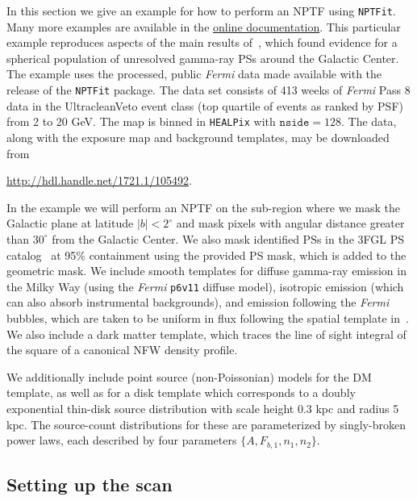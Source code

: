 In this section we give an example for how to perform an NPTF using \texttt{NPTFit}.  Many more examples are available in the \href{http://nptfit.readthedocs.io}{online documentation}.  This particular example reproduces aspects of the main results of~\cite{Lee:2015fea}, which found evidence for a spherical population of unresolved gamma-ray PSs around the Galactic Center.  The example uses the processed, public {\it Fermi} data made available with the release of the \texttt{NPTFit} package.  The data set consists of 413 weeks of \emph{Fermi} Pass 8 data in the UltracleanVeto event class (top quartile of events as ranked by PSF) from 2 to 20 GeV.  The map is binned in \texttt{HEALPix} with $\mathtt{nside} = 128$.  The data, along with the exposure map and background templates, may be downloaded from 
\begin{center}
\url{http://hdl.handle.net/1721.1/105492}.
\end{center}

In the example we will perform an NPTF on the sub-region where we mask the Galactic plane at latitude $|b| < 2^\circ$ and mask pixels with angular distance greater than $30^\circ$ from the Galactic Center.  We also mask identified PSs in the 3FGL PS catalog~\cite{Acero:2015hja} at 95\% containment using the provided PS mask, which is added to the geometric mask.  We include smooth templates for diffuse gamma-ray emission in the Milky Way (using the {\it Fermi} \texttt{p6v11} diffuse model), isotropic emission (which can also absorb instrumental backgrounds), and emission following the {\it Fermi} bubbles, which are taken to be uniform in flux following the spatial template in~\cite{Su:2010qj}.  We also include a dark matter template, which traces the line of sight integral of the square of a canonical NFW density profile.

We additionally include point source (non-Poissonian) models for the DM template, as well as for a disk template which corresponds to a doubly exponential thin-disk source distribution with scale height 0.3 kpc and radius 5 kpc. The source-count distributions for these are parameterized by singly-broken power laws, each described by four parameters $\{ A, F_{b,1}, n_1, n_2 \}$.

\subsection{Setting up the scan}

